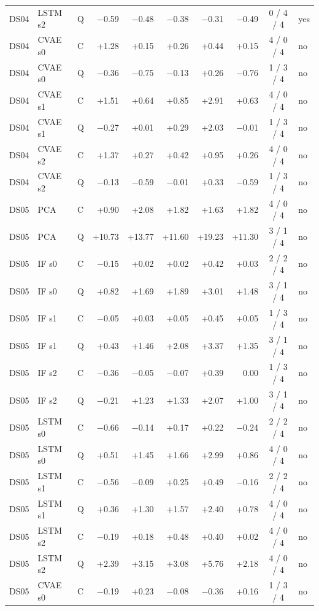 \documentclass[10pt]{article}
\begin{document}
{\begin{longtable}{lllrrrrrcl}
DS04 & LSTM s2 & Q & −0.59 & −0.48 & −0.38 & −0.31 & −0.49 & 0 / 4 / 4 & yes \\
DS04 & CVAE s0 & C & +1.28 & +0.15 & +0.26 & +0.44 & +0.15 & 4 / 0 / 4 & no \\
DS04 & CVAE s0 & Q & −0.36 & −0.75 & −0.13 & +0.26 & −0.76 & 1 / 3 / 4 & no \\
DS04 & CVAE s1 & C & +1.51 & +0.64 & +0.85 & +2.91 & +0.63 & 4 / 0 / 4 & no \\
DS04 & CVAE s1 & Q & −0.27 & +0.01 & +0.29 & +2.03 & −0.01 & 1 / 3 / 4 & no \\
DS04 & CVAE s2 & C & +1.37 & +0.27 & +0.42 & +0.95 & +0.26 & 4 / 0 / 4 & no \\
DS04 & CVAE s2 & Q & −0.13 & −0.59 & −0.01 & +0.33 & −0.59 & 1 / 3 / 4 & no \\
\midrule
DS05 & PCA & C & +0.90 & +2.08 & +1.82 & +1.63 & +1.82 & 4 / 0 / 4 & no \\
DS05 & PCA & Q & +10.73 & +13.77 & +11.60 & +19.23 & +11.30 & 3 / 1 / 4 & no \\
DS05 & IF s0 & C & −0.15 & +0.02 & +0.02 & +0.42 & +0.03 & 2 / 2 / 4 & no \\
DS05 & IF s0 & Q & +0.82 & +1.69 & +1.89 & +3.01 & +1.48 & 3 / 1 / 4 & no \\
DS05 & IF s1 & C & −0.05 & +0.03 & +0.05 & +0.45 & +0.05 & 1 / 3 / 4 & no \\
DS05 & IF s1 & Q & +0.43 & +1.46 & +2.08 & +3.37 & +1.35 & 3 / 1 / 4 & no \\
DS05 & IF s2 & C & −0.36 & −0.05 & −0.07 & +0.39 & 0.00 & 1 / 3 / 4 & no \\
DS05 & IF s2 & Q & −0.21 & +1.23 & +1.33 & +2.07 & +1.00 & 3 / 1 / 4 & no \\
DS05 & LSTM s0 & C & −0.66 & −0.14 & +0.17 & +0.22 & −0.24 & 2 / 2 / 4 & no \\
DS05 & LSTM s0 & Q & +0.51 & +1.45 & +1.66 & +2.99 & +0.86 & 4 / 0 / 4 & no \\
DS05 & LSTM s1 & C & −0.56 & −0.09 & +0.25 & +0.49 & −0.16 & 2 / 2 / 4 & no \\
DS05 & LSTM s1 & Q & +0.36 & +1.30 & +1.57 & +2.40 & +0.78 & 4 / 0 / 4 & no \\
DS05 & LSTM s2 & C & −0.19 & +0.18 & +0.48 & +0.40 & +0.02 & 4 / 0 / 4 & no \\
DS05 & LSTM s2 & Q & +2.39 & +3.15 & +3.08 & +5.76 & +2.18 & 4 / 0 / 4 & no \\
DS05 & CVAE s0 & C & −0.19 & +0.23 & −0.08 & −0.36 & +0.16 & 1 / 3 / 4 & no \\

\end{longtable}}
\end{document}
